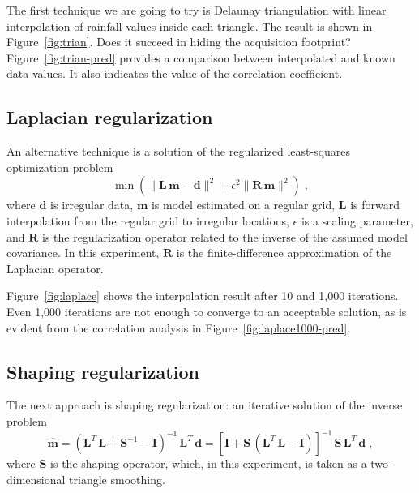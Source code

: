 The first technique we are going to try is Delaunay triangulation with
linear interpolation of rainfall values inside each triangle. The
result is shown in Figure~\ref{fig:trian}. Does it succeed in hiding
the acquisition footprint? Figure~\ref{fig:trian-pred} provides a
comparison between interpolated and known data values. It also
indicates the value of the correlation coefficient.


\subsection{Laplacian regularization}

An alternative technique is a solution of the regularized
least-squares optimization problem
\begin{equation}
\label{eq:laplace}
\min\left( \|\mathbf{L}\,\mathbf{m} - \mathbf{d}\|^2 + \epsilon^2 \|\mathbf{R}\,\mathbf{m}\|^2\right)\;,
\end{equation}
where $\mathbf{d}$ is irregular data, $\mathbf{m}$ is model estimated
on a regular grid, $\mathbf{L}$ is forward interpolation from the
regular grid to irregular locations, $\epsilon$ is a scaling
parameter, and $\mathbf{R}$ is the regularization operator related to
the inverse of the assumed model covariance. In this experiment,
$\mathbf{R}$ is the finite-difference approximation of the Laplacian operator.


Figure~\ref{fig:laplace} shows the interpolation result after 10 and
1,000 iterations. Even 1,000 iterations are not enough to converge to
an acceptable solution, as is evident from the correlation analysis in Figure~\ref{fig:laplace1000-pred}.


\subsection{Shaping regularization}

The next approach is shaping regularization: an iterative solution of the inverse problem
\begin{equation}
\widehat{\mathbf{m}} = 
  \left(\mathbf{L}^T\,\mathbf{L} + \mathbf{S}^{-1} -
    \mathbf{I}\right)^{-1}\,\mathbf{L}^T\,\mathbf{d}
  = \left[\mathbf{I} + 
    \mathbf{S}\,\left(\mathbf{L}^T\,\mathbf{L} - \mathbf{I}\right)\right]^{-1}\,
  \mathbf{S}\,\mathbf{L}^T\,\mathbf{d}\;,
  \label{eqn:shape}  
\end{equation}
where $\mathbf{S}$ is the shaping operator, which, in this experiment,
is taken as a two-dimensional triangle smoothing.

